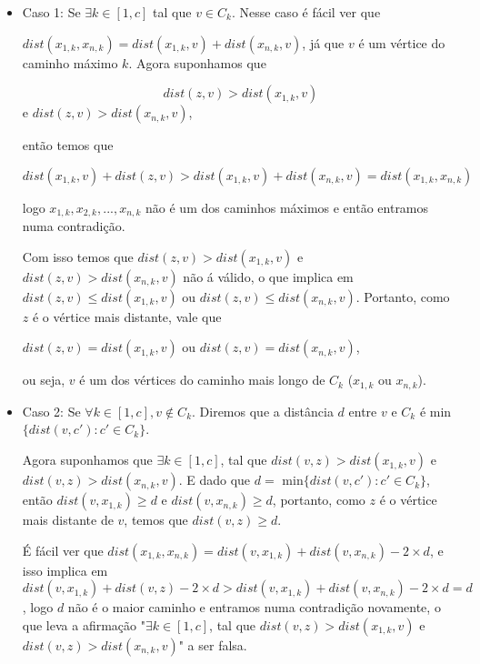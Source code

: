 \documentclass[a4paper,12pt]{article}
\begin{document}
        \begin{itemize}
            \item Caso 1: Se $\exists k \in [1, c]$ tal que 
            $v \in C_k$.
            Nesse caso é fácil ver que 

            $dist(x_{1, k}, x_{n, k})=
            dist(x_{1, k}, v)+dist(x_{n, k}, v)$, 
            já que $v$ é um vértice do caminho máximo $k$.
            Agora suponhamos que 

            $$dist(z, v)>dist(x_{1, k}, v)$$ e 
            $dist(z, v)>dist(x_{n, k}, v)$,
            
            então temos que 
            
            $$dist(x_{1, k}, v)+dist(z, v)>
            dist(x_{1, k}, v)+dist(x_{n, k}, v)=
            dist(x_{1, k}, x_{n, k})$$
            
            logo $x_{1, k}, x_{2, k},..., x_{n, k}$ não é um dos 
            caminhos máximos e então entramos numa contradição.

            Com isso temos que 
            $dist(z, v)>dist(x_{1, k}, v)$ e 
            $dist(z, v)>dist(x_{n, k}, v)$ não á válido, o que 
            implica em $dist(z, v)\le dist(x_{1, k}, v)$ ou 
            $dist(z, v)\le dist(x_{n, k}, v)$. 
            Portanto, como $z$ é o vértice mais distante, vale que
            
            $dist(z, v)=dist(x_{1, k}, v)$ ou 
            $dist(z, v)=dist(x_{n, k}, v)$,
            
            ou seja, $v$ é um dos vértices do caminho mais longo
            de $C_k$ ($x_{1, k}$ ou $x_{n, k}$).

            \item Caso 2: Se $\forall k \in [1, c], v \notin C_k$. 
            Diremos que a distância $d$ entre $v$ e $C_k$ é 
            min$\{dist(v, c'): c'\in C_k\}$.

            Agora suponhamos que $\exists k \in [1, c]$, tal que
            $dist(v, z)>dist(x_{1, k}, v)$ e 
            $dist(v, z)>dist(x_{n, k}, v)$.
            E dado que $d=$ min$\{dist(v, c'): c'\in C_k\}$, então
            $dist(v, x_{1, k})\ge d$ e 
            $dist(v, x_{n, k})\ge d$, 
            portanto, como $z$ é o vértice mais distante de $v$, 
            temos que
            $dist(v, z)\ge d$.

            É fácil ver que 
            $dist(x_{1, k}, x_{n, k})=
            dist(v, x_{1, k})+dist(v, x_{n, k})-2\times d$, 
            e isso implica em
            $dist(v, x_{1, k})+dist(v, z)-2\times d>
            dist(v, x_{1, k})+dist(v, x_{n, k})-2\times d=d$, 
            logo $d$ não é o maior caminho e entramos numa 
            contradição novamente, o que leva a afirmação
            "$\exists k \in [1, c]$, tal que
            $dist(v, z)>dist(x_{1, k}, v)$ e 
            $dist(v, z)>dist(x_{n, k}, v)$" a ser falsa.


\end{itemize}
\end{document}
